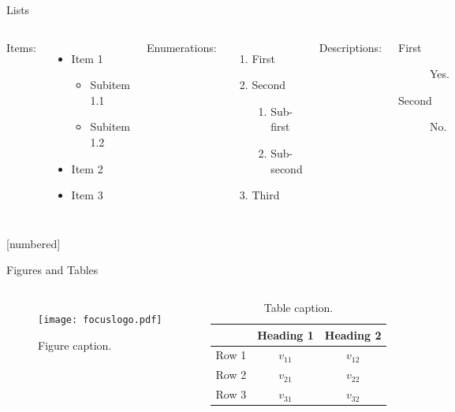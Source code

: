 \documentclass[aspectratio=169]{beamer}
\begin{document}
    \begin{frame}{Lists}
	\begin{columns}[t, onlytextwidth]
		Items:
		\begin{itemize}
			\item Item 1
			\begin{itemize}
				\item Subitem 1.1
				\item Subitem 1.2
			\end{itemize}
			\item Item 2
			\item Item 3
		\end{itemize}
		
		Enumerations:
		\begin{enumerate}
			\item First
			\item Second
			\begin{enumerate}
				\item Sub-first
				\item Sub-second
			\end{enumerate}
			\item Third
		\end{enumerate}
		
		Descriptions:
		\begin{description}
			\item[First] Yes.
			\item[Second] No.
		\end{description}
	\end{columns}
\end{frame}
[numbered]
    \begin{frame}{Figures and Tables}
        \begin{columns}
                \begin{figure}
                    \centering
                    \texttt{[image: focuslogo.pdf]}
                    \caption{Figure caption.}
                    \label{fig:focuslogo}
                \end{figure}
                
                \begin{table}
                    \centering
                    \begin{tabular}{rcc}
                         & Heading 1 & Heading 2 \\\hline
                        Row 1 & \(v_{11}\) & \(v_{12}\) \\
                        Row 2 & \(v_{21}\) & \(v_{22}\) \\
                        Row 3 & \(v_{31}\) & \(v_{32}\) \\
                    \end{tabular}
                    \caption{Table caption.}
                    \label{tab:demo}
                \end{table}
        \end{columns}
    \end{frame}
    
\end{document}
